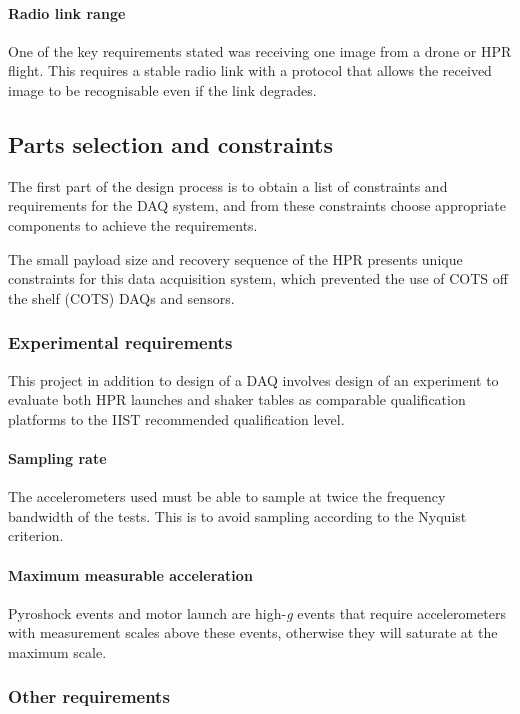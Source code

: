 \documentclass[a4paper,11pt]{article}
\begin{document}
\paragraph{Radio link range} One of the key requirements stated was receiving one image from a drone or HPR flight. This requires a stable radio link with a protocol that allows the received image to be recognisable even if the link degrades.


\subsection{Parts selection and constraints}

The first part of the design process is to obtain a list of constraints and requirements for the DAQ system, and from these constraints choose appropriate components to achieve the requirements.

The small payload size and recovery sequence of the HPR presents unique constraints for this data acquisition system, which prevented the use of COTS off the shelf (COTS) DAQs and sensors.

\subsubsection{Experimental requirements}

This project in addition to design of a DAQ involves design of an experiment to evaluate both HPR launches and shaker tables as comparable qualification platforms to the IIST recommended qualification level.

\paragraph{Sampling rate} The accelerometers used must be able to sample at twice the frequency bandwidth of the tests. This is to avoid sampling according to the Nyquist criterion.

\paragraph{Maximum measurable acceleration} Pyroshock events and motor launch are high-\textit{g} events that require accelerometers with measurement scales above these events, otherwise they will saturate at the maximum scale.

\subsubsection{Other requirements}
\end{document}
